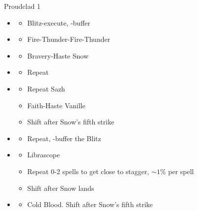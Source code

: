 \begin{multicols}{2}
\begin{battle}[1:31]{Proudclad 1}
  \begin{itemize}
    \item \second
          \begin{itemize}
            \item Blitz-execute, \rav-buffer
          \end{itemize}
    \item \sixth
          \begin{itemize}
            \item Fire-Thunder-Fire-Thunder
          \end{itemize}
    \item \fourth
          \begin{itemize}
            \item Bravery-Haste Snow
          \end{itemize}
    \item \sixth
          \begin{itemize}
            \item Repeat
          \end{itemize}
    \item \fourth
          \begin{itemize}
            \item Repeat Sazh
            \item Faith-Haste Vanille
            \item Shift after Snow's fifth strike
          \end{itemize}
    \item \first
          \begin{itemize}
            \item Repeat, \rav-buffer the Blitz
          \end{itemize}
    \item \fifth
          \begin{itemize}
            \item Librascope
            \item Repeat 0-2 spells to get close to stagger, $\sim1\%$ per spell
            \item Shift after Snow lands
          \end{itemize}
    \item \sixth
          \begin{itemize}
            \item Cold Blood. Shift after Snow's fifth strike
          \end{itemize}

\end{itemize}
\end{battle}
\end{multicols}

